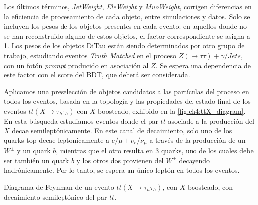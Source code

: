Los últimos términos, \textit{JetWeight}, \textit{EleWeight} y \textit{MuoWeight}, corrigen diferencias en la eficiencia de procesamiento de cada objeto, entre simulaciones y datos. Solo se incluyen los pesos de los objetos presentes en cada evento: en aquellos donde no se han reconstruido alguno de estos objetos, el factor correspondiente se asigna a 1. Los pesos de los objetos DiTau están siendo determinados por otro grupo de trabajo, estudiando eventos \textit{Truth Matched} en el proceso $Z(\to\tau\tau) + \gamma/Jets$, con un fotón \textit{prompt} producido en asociación al $Z$. Se espera una dependencia de este factor con el score del BDT, que deberá ser considerada.





 \label{sec:ch4:presel_cuts}

Aplicamos una preselección de objetos candidatos a las partículas del proceso en todos los eventos, basada en la topología y las propiedades del estado final de los eventos $tt(X\to\tau_h\tau_h)$ con $X$ boosteado, exhibido en la \cref{fig:ch4:ttX_diagram}. En esta búsqueda estudiamos eventos donde el par $t\bar{t}$ asociado a la producción del $X$ decae semileptónicamente. En este canal de decaimiento, solo uno de los quarks top decae leptonicamente a $e/\mu + \nu_e/\nu_\mu$ a través de la producción de un $W^\pm$ y un quark $b$, mientras que el otro resulta en 3 quarks, uno de los cuales debe ser también un quark $b$ y los otros dos provienen del $W^\pm$ decayendo hadrónicamente. Por lo tanto, se espera un único leptón en todos los eventos.

\begin{marginfigure}
    \resizebox{\linewidth}{!}{\ttXdiagram}
    \caption{Diagrama de Feynman de un evento $t\bar{t}(X \to \tau_h \tau_h)$, con $X$ boosteado, con decaimiento semileptónico del par $t\bar{t}$.}
    \label{fig:ch4:ttX_diagram}
\end{marginfigure}

